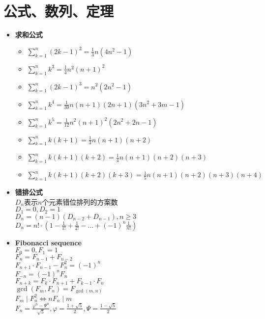 \section{公式、数列、定理}
	\begin{itemize}
		\item \textbf{求和公式}
			\begin{itemize}
				\item $ \sum\limits_{k=1}^{n} (2k - 1)^2 = \frac{1}{3} n(4n^2 - 1) $
				\item $ \sum\limits_{k=1}^{n} k^3 = \frac{1}{4} n^2(n + 1)^2 $
				\item $ \sum\limits_{k=1}^{n} (2k - 1)^3 = n^2(2n^2 - 1) $
				\item $ \sum\limits_{k=1}^{n} k^4 = \frac{1}{30} n(n + 1) (2n + 1) (3n^2 + 3m - 1) $
				\item $ \sum\limits_{k=1}^{n} k^5 = \frac{1}{12} n^2(n + 1)^2(2n^2 + 2n - 1) $
				\item $ \sum\limits_{k=1}^{n} k(k + 1) = \frac{1}{3} n(n + 1)(n + 2) $
				\item $ \sum\limits_{k=1}^{n} k(k + 1)(k + 2) = \frac{1}{4} n(n + 1)(n + 2)(n + 3) $
				\item $ \sum\limits_{k=1}^{n} k(k + 1)(k + 2)(k + 3) = \frac{1}{5} n(n + 1)(n + 2)(n + 3)(n + 4) $
			\end{itemize}
		\item \textbf{错排公式}
			\\$ D_n $表示$ n $个元素错位排列的方案数
			\\$ D_1 = 0, D_2 = 1 $
			\\$ D_n = (n - 1)(D_{n - 2} + D_{n - 1}), n \geq 3 $
			\\$ D_n = n! \cdot (1 - \frac{1}{1!} + \frac{1}{2!} - \dots + (-1)^n\frac{1}{n!}) $
		\item \textbf{Fibonacci sequence}
			\\$ F_0 = 0, F_1 = 1 $
			\\$ F_n = F_{n - 1} + F_{n - 2} $
			\\$ F_{n + 1} \cdot F_{n - 1} - F_{n}^2 = (-1)^n $
			\\$ F_{-n} = (-1)^n F_n $
			\\$ F_{n + k} = F_k \cdot F_{n + 1} + F_{k - 1} \cdot F_n $
			\\$ \gcd(F_m, F_n) = F_{\gcd(m, n)} $
			\\$ F_m \mid F_n^2 \Leftrightarrow nF_n \mid m $
			\\$ F_n = \frac{\varphi^n - \varPsi^n}{\sqrt{5}}, \varphi = \frac{1 + \sqrt{5}}{2}, \varPsi = \frac{1 - \sqrt{5}}{2} $

\end{itemize}
